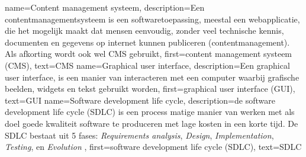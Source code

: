 \makenoidxglossaries

{
	name={Content management systeem},
	description={Een contentmanagementsysteem is een softwaretoepassing,
			meestal een webapplicatie, die het mogelijk maakt dat mensen eenvoudig, zonder veel technische kennis,
			documenten en gegevens op internet kunnen publiceren (contentmanagement).
			Als afkorting wordt ook wel CMS gebruikt},
	first={content management systeem (CMS)},
	text={CMS}
}
{
	name={Graphical user interface},
	description={Een graphical user interface, is een manier van interacteren met een computer waarbij grafische beelden, widgets en tekst gebruikt worden},
	first={graphical user interface (GUI)},
	text={GUI}
}
{
	name={Software development life cycle},
	description={de software development life cycle (SDLC) is een process matige manier van werken met als doel goede kwaliteit software te produceren met lage kosten in een korte tijd.
    De SDLC bestaat uit 5 fases: \textit{Requirements analysis}, \textit{Design}, \textit{Implementation}, \textit{Testing}, en \textit{Evolution} \Parencite{SDLC}},
	first={software development life cycle (SDLC)},
	text={SDLC}
}
